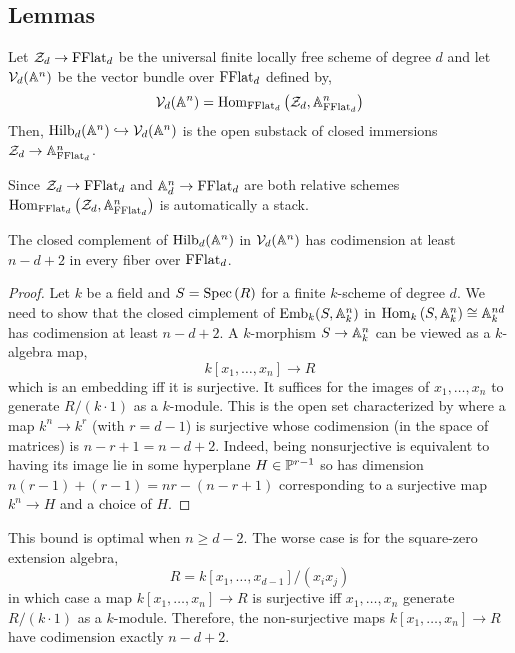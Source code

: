\documentclass[12pt]{article}
\begin{document}
\subsection{Lemmas}

\newcommand{\cZ}{\mathcal{Z}}
\newcommand{\Rees}{\mathrm{Rees}}

\begin{defn}
Let $\cZ_d \to \FFlat_d$ be the universal finite locally free scheme of degree $d$ and let $\cV_d(\A^n)$ be the vector bundle over $\FFlat_d$ defined by,
\[ \cV_d(\A^n) = \Hom{\FFlat_d}{\cZ_d}{\A^n_{\FFlat_d}} \]
Then, $\Hilb_d(\A^n) \embed \cV_d(\A^n)$ is the open substack of closed immersions $\cZ_d \to \A^n_{\FFlat_d}$. 
\end{defn}

\begin{rmk}
Since $\cZ_d \to \FFlat_d$ and $\A_d^n \to \FFlat_d$ are both relative schemes $\Hom{\FFlat_d}{\cZ_d}{\A^n_{\FFlat_d}}$ is automatically a stack. 
\end{rmk}

\begin{lemma}
The closed complement of $\Hilb_d(\A^n)$ in $\cV_d(\A^n)$ has codimension at least $n-d+2$ in every fiber over $\FFlat_d$. 
\end{lemma}

\begin{proof}
Let $k$ be a field and $S = \Spec{R}$ for a finite $k$-scheme of degree $d$. We need to show that the closed cimplement of $\mathrm{Emb}_k(S, \A^n_k)$ in $\Hom{k}{S}{\A^n_k} \cong \A^{nd}_k$ has codimension at least $n - d + 2$. A $k$-morphism $S \to \A^n_k$ can be viewed as a $k$-algebra map,
\[ k[x_1, \dots, x_n] \to R \]
which is an embedding iff it is surjective. It suffices for the images of $x_1, \dots, x_n$ to generate $R / (k \cdot 1)$ as a $k$-module. This is the open set characterized by where a map $k^n \to k^{r}$ (with $r = d-1$) is surjective whose codimension (in the space of matrices) is $n - r + 1 = n - d + 2$. Indeed, being nonsurjective is equivalent to having its image lie in some hyperplane $H \in \P^{r-1}$ so has dimension $n(r-1) + (r-1) = nr - (n - r + 1)$ corresponding to a surjective map $k^n \to H$ and a choice of $H$.
\end{proof}

\begin{rmk}
This bound is optimal when $n \ge d - 2$. The worse case is for the square-zero extension algebra,
\[ R = k[x_1, \dots, x_{d-1}]/(x_i x_j) \]
in which case a map $k[x_1, \dots, x_n] \to R$ is surjective iff $x_1, \dots, x_n$ generate $R / (k \cdot 1)$ as a $k$-module. Therefore, the non-surjective maps $k[x_1, \dots, x_n] \to R$ have codimension exactly $n - d + 2$. 
\end{rmk}
\end{document}
